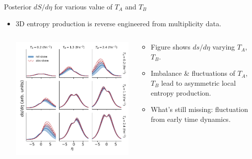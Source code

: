 \documentclass[11pt]{beamer}
\begin{document}
\begin{frame}{Posterior $dS/d\eta$ for various value of $T_A$ and $T_B$}
\begin{itemize}
\item 3D entropy production is reverse engineered from multiplicity data.
\begin{columns}
\begin{column}{0.6\textwidth}
\includegraphics[width=\textwidth]{post_dsdy.pdf}
\end{column}
\begin{column}{0.4\textwidth}
\begin{itemize}
\item Figure shows $ds/d\eta$ varying $T_A$, $T_B$.
\item Imbalance \& fluctuations of $T_A$, $T_B$ lead to asymmetric local entropy production.
\item What's still missing: fluctuation from early time dynamics.
\end{itemize}
\end{column}
\end{columns}
\end{itemize}
\end{frame}
\end{document}
